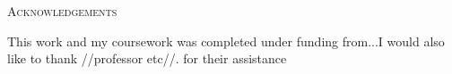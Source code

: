 \begin{center}
   {\LARGE\textsc{Acknowledgements}}

   This work and my coursework was completed under funding from...I would also like to thank //professor etc//. for their assistance 
\end{center}

